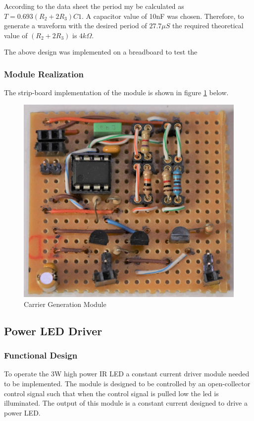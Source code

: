 According to the data sheet the period my be calculated as \(T = 0.693 (R_2 + 2R_3) C1\). A capacitor value of 10nF was chosen. Therefore, to generate a waveform with the desired period of $27.7\mu S$ the required theoretical value of $(R_2 + 2R_3)$ is $4k\Omega$.

The above design was implemented on a breadboard to test the

\subsubsection{Module Realization}
The strip-board implementation of the module is shown in figure \ref{fig:module_carrier_generation} below.

\begin{figure}[H]
	\centering
	\includegraphics[width=.6\textwidth]{figures/modules/carrier_generator.jpg}
	\caption{Carrier Generation Module}
	\label{fig:module_carrier_generation}
\end{figure}






\subsection{Power LED Driver}

\subsubsection{Functional Design}
To operate the 3W high power IR LED a constant current driver module needed to be implemented. The module is designed to be controlled by an open-collector control signal such that when the control signal is pulled low the led is illuminated. The output of this module is a constant current designed to drive a power LED.

